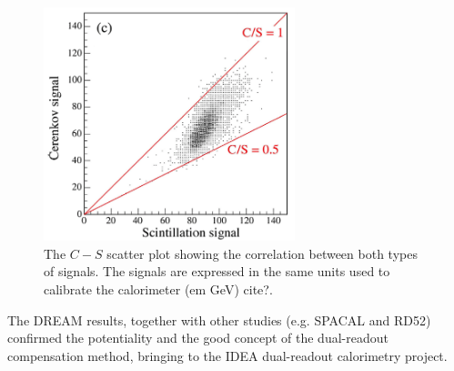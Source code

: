 \begin{figure}
	\centering
	\includegraphics[width=0.65\textwidth]{IMG/Cap2/theta_DREAM.png}
	\caption{ The $C−S$ scatter plot showing the correlation between both types of signals. The signals are expressed in the same units used to calibrate the calorimeter (em GeV) cite?.}
	\label{fig:theta_DREAM}
\end{figure}

The DREAM results, together with other studies (e.g. SPACAL and RD52) confirmed the potentiality and the good concept of the dual-readout compensation method, bringing to the IDEA dual-readout calorimetry project.